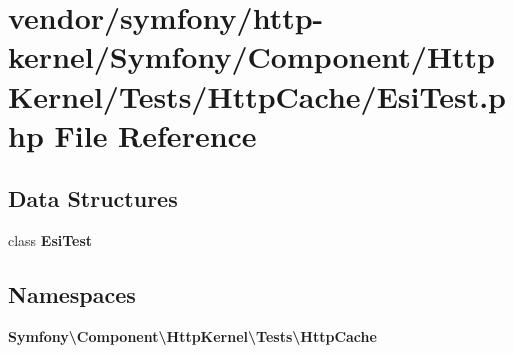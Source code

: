 \section{vendor/symfony/http-\/kernel/\+Symfony/\+Component/\+Http\+Kernel/\+Tests/\+Http\+Cache/\+Esi\+Test.php File Reference}
\label{_esi_test_8php}
\subsection*{Data Structures}
\begin{DoxyCompactItemize}
\item 
class {\bf Esi\+Test}
\end{DoxyCompactItemize}
\subsection*{Namespaces}
\begin{DoxyCompactItemize}
\item 
 {\bf Symfony\textbackslash{}\+Component\textbackslash{}\+Http\+Kernel\textbackslash{}\+Tests\textbackslash{}\+Http\+Cache}
\end{DoxyCompactItemize}

